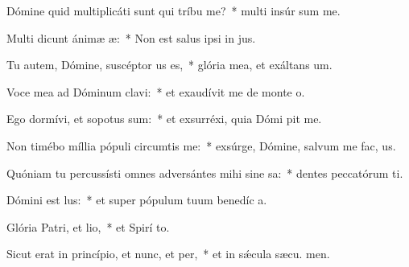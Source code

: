 \item Dómine quid multiplicáti sunt qui tríbu me?~* multi insúr sum me.
\item Multi dicunt ánimæ æ:~* Non est salus ipsi in  jus.
\item Tu autem, Dómine, suscéptor us es,~* glória mea, et exáltans  um.
\item Voce mea ad Dóminum clavi:~* et exaudívit me de monte  o.
\item Ego dormívi, et sopotus sum:~* et exsurréxi, quia Dómi pit me.
\item Non timébo míllia pópuli circumtis me:~* exsúrge, Dómine, salvum me fac,  us.
\item Quóniam tu percussísti omnes adversántes mihi sine sa:~* dentes peccatórum ti.
\item Dómini est lus:~* et super pópulum tuum benedíc a.
\item Glória Patri, et lio,~* et Spirí to.
\item Sicut erat in princípio, et nunc, et per,~* et in sǽcula sæcu. men.
